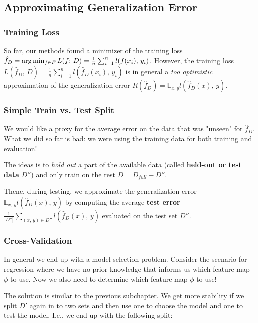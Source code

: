 \documentclass[a4paper]{extarticle}
\begin{document}
\subsection{Approximating Generalization Error}

\subsubsection{Training Loss}

So far, our methods found a minimizer of the training loss \(\hat{f}_D = \arg \min_{f \in F} L(f; \, D) =\\ \frac{1}{n} \sum_{i = 1}^n l(f(x_i), \, y_i)\). However, the training loss \(L(\hat{f}_D, \, D) = \frac{1}{n} \sum_{i = 1}^n l(\hat{f}_D(x_i), \, y_i)\) is in general a \textit{too optimistic} approximation of the generalization error \(R(\hat{f}_D) = \mathbb{E}_{x,y}l(\hat{f}_D(x), \, y)\).

\subsubsection{Simple Train vs. Test Split}

We would like a proxy for the average error on the data that was "unseen" for \(\hat{f}_D\). What we did so far is bad: we were using the training data for both training and evaluation!

The ideas is to \textit{hold out} a part of the available data (called \textbf{held-out or test data} \(D''\)) and only train on the rest \(D = D_{full} - D''\).

Thene, during testing, we approximate the generalization error \(\mathbb{E}_{x, \,y}l(\hat{f}_D(x), \, y)\) by computing the average \textbf{test error} \(\frac{1}{|D''|}\sum_{(x, \, y)\in D''}l(\hat{f}_D(x), \, y)\) evaluated on the test set \(D''\).

\subsubsection{Cross-Validation}

In general we end up with a model selection problem. Consider the scenario for regression where we have no prior knowledge that informs us which feature map \(\phi\) to use. Now we also need to determine which feature map \(\phi\) to use!

The solution is similar to the previous subchapter. We get more stability if we split \(D'\) again in to two sets and then use one to choose the model and one to test the model. I.e., we end up with the following split:
\end{document}
